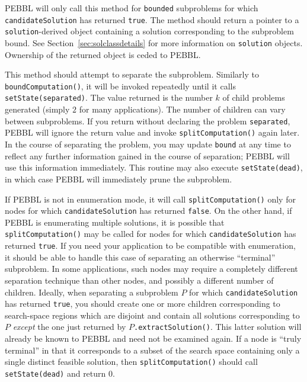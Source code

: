  PEBBL will only call this method
for \texttt{bounded} subproblems for which \texttt{candidateSolution}
has returned \texttt{true}.  The method should return a pointer to a
\texttt{solution}-derived object containing a solution corresponding
to the subproblem bound.  See Section~\ref{sec:solclassdetails} for
more information on \texttt{solution} objects.  Ownership of the
returned object is ceded to PEBBL.


This method should attempt to separate the subproblem.  Similarly to
\texttt{boundComputation()}, it will be invoked repeatedly until it
calls \texttt{setState(separated)}.  The value returned is the number $k$
of child problems generated (simply $2$ for many applications).  The
number of children can vary between subproblems.
If you return without declaring the problem \texttt{separated}, PEBBL
will ignore the return value and invoke \texttt{splitComputation()}
again later.  In the course of separating the problem, you may update
\texttt{bound} at any time to reflect any further information gained
in the course of separation; PEBBL will use this
information immediately.  This routine may also execute
\texttt{setState(dead)}, in which case PEBBL will immediately prune
the subproblem.

If PEBBL is not in enumeration mode, it will call
\texttt{splitComputation()} only for nodes for which
\texttt{candidateSolution} has returned \texttt{false}.  On the other
hand, if PEBBL is enumerating multiple solutions, it is possible that
\texttt{splitComputation()} may be called for nodes for which
\texttt{candidateSolution} has returned \texttt{true}.  If you need
your application to be compatible with enumeration, it should be able
to handle this case of separating an otherwise ``terminal''
subproblem.  In some applications, such
nodes may require a completely different separation technique than
other nodes, and possibly a different number of children.  Ideally,
when separating a subproblem $P$ for which \texttt{candidateSolution}
has returned \texttt{true}, you should create one or more children
corresponding to search-space regions which are disjoint and contain
all solutions corresponding to $P$ \emph{except} the one just returned
by $P\!$\texttt{.extractSolution()}.  This latter solution will already
be known to PEBBL and need not be examined again.  If a node is
``truly terminal'' in that it corresponds to a subset of the search
space containing only a single distinct feasible solution, then
\texttt{splitComputation()} should call \texttt{setState(dead)} and
return $0$.

